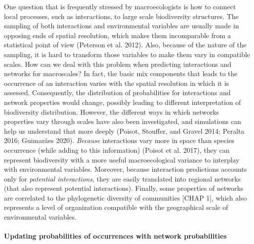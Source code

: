 \documentclass[11pt]{article}
\begin{document}
One question that is frequently stressed by macroecologists is how to
connect local processes, such as interactions, to large scale
biodiversity structures. The sampling of both interactions and
environmental variables are usually made in opposing ends of spatial
resolution, which makes them incomparable from a statistical point of
view (Peterson et al. 2012). Also, because of the nature of the
sampling, it is hard to transform those variables to make them vary in
compatible scales. How can we deal with this problem when predicting
interactions and networks for macroscales? In fact, the basic mix
components that leads to the occurrence of an interaction varies with
the spatial resolution in which it is assessed. Consequently, the
distribution of probabilities for interactions and network properties
would change, possibly leading to different interpretation of
biodiversity distribution. However, the different ways in which networks
properties vary through scales have also been investigated, and
simulations can help us understand that more deeply (Poisot, Stouffer,
and Gravel 2014; Peralta 2016; Guimarães 2020). \emph{Because}
interactions vary more in space than species occurrence (while adding to
this information) (Poisot et al. 2017), they can represent biodiversity
with a more useful macroecological variance to interplay with
environmental variables. Moreover, because interaction predictions
accounts only for \emph{potential interactions}, they are easily
translated into regional networks (that also represent potential
interactions). Finally, some properties of networks are correlated to
the phylogenetic diversity of communities {[}CHAP 1{]}, which also
represents a level of organization compatible with the geographical
scale of environmental variables.

\hypertarget{updating-probabilities-of-occurrences-with-network-probabilities}{%
\paragraph{Updating probabilities of occurrences with network
probabilities}\label{updating-probabilities-of-occurrences-with-network-probabilities}}
\end{document}
